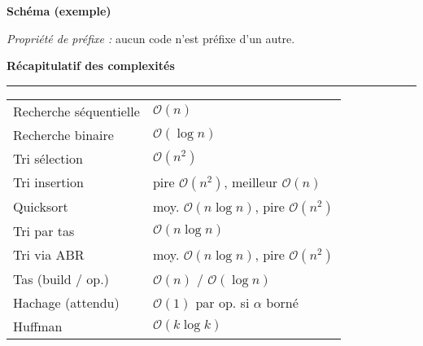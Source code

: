 \documentclass[9pt,a4paper]{article}
\newcommand{\bigO}{\mathcal{O}}
\newcommand{\sect}[1]{\vspace{1ex}\textbf{\large #1}\par\vspace{0.3ex}\hrule\vspace{0.6ex}}
\newcommand{\subsect}[1]{\vspace{0.4ex}\textbf{#1}\par}
\begin{document}
\begin{multicols}{3}
    \subsect{Schéma (exemple)}
    \begin{center}
    \end{center}
    \emph{Propriété de préfixe :} aucun code n'est préfixe d'un autre.

    \sect{Récapitulatif des complexités}
    \begin{tabularx}{\linewidth}{@{}l>{\raggedleft\arraybackslash}X@{}}
        Recherche séquentielle & $\bigO(n)$                               \\
        Recherche binaire      & $\bigO(\log n)$                          \\
        Tri sélection          & $\bigO(n^2)$                             \\
        Tri insertion          & pire $\bigO(n^2)$, meilleur $\bigO(n)$   \\
        Quicksort              & moy. $\bigO(n\log n)$, pire $\bigO(n^2)$ \\
        Tri par tas            & $\bigO(n\log n)$                         \\
        Tri via ABR            & moy. $\bigO(n\log n)$, pire $\bigO(n^2)$ \\
        Tas (build / op.)      & $\bigO(n)$ / $\bigO(\log n)$             \\
        Hachage (attendu)      & $\bigO(1)$ par op. si $\alpha$ borné     \\
        Huffman                & $\bigO(k\log k)$                         \\
    \end{tabularx}

\end{multicols}
\end{document}
